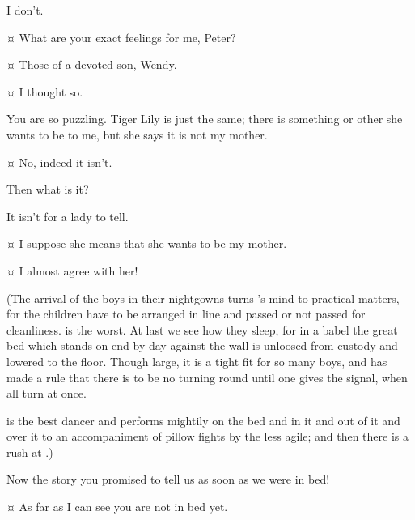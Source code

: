 \begin{drama}
\peterspeaks
I don't.

\wendyspeaks {}¤
What are your exact feelings for me, Peter?

\peterspeaks {}¤
Those of a devoted son, Wendy.

\wendyspeaks {}¤
I thought so.

\peterspeaks
You are so puzzling.
Tiger Lily is just the same; there is something or other she wants to be to me,
but she says it is not my mother.

\wendyspeaks {}¤
No, indeed it isn't.

\peterspeaks
Then what is it?

\wendyspeaks
It isn't for a lady to tell.


\peterspeaks {}¤
I suppose she means that she wants to be my mother.


\wendyspeaks {}¤
I almost agree with her!

\begin{stagedir}
(The arrival of the boys in their nightgowns turns \wendy's mind to practical matters,
for the children have to be arranged in line and passed or not passed for cleanliness.
\slightly is the worst.
At last we see how they sleep,
for in a babel the great bed which stands on end by day against the wall is unloosed from custody
and lowered to the floor.
Though large, it is a tight fit for so many boys,
and \wendy has made a rule that there is to be no turning round until one gives the signal, when all turn at once.

\firsttwin is the best dancer and performs mightily on the bed and in it and out of it and over it
to an accompaniment of pillow fights by the less agile;
and then there is a rush at \wendy.)
\end{stagedir}

\nibsspeaks
Now the story you promised to tell us as soon as we were in bed!

\wendyspeaks {}¤
As far as I can see you are not in bed yet.



\end{drama}
